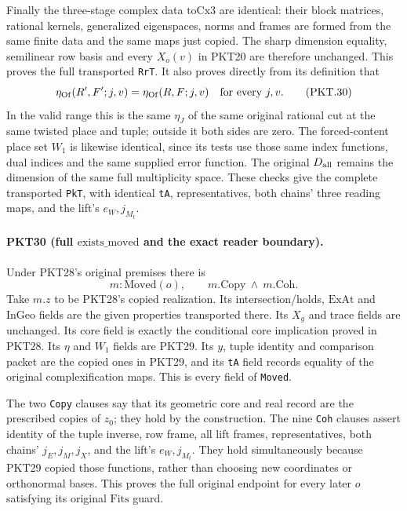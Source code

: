 Finally the three-stage complex data $\mathrm{toCx3}$ are identical:
their block matrices, rational kernels, generalized eigenspaces, norms and
frames are formed from the same finite data and the same maps just copied.
The sharp dimension equality, semilinear row basis and every $X_o(v)$
in PKT20 are therefore unchanged.  This proves the full transported
\texttt{RrT}.  It also proves directly from its definition that
\[
 \eta_{\rm Of}(R',F';j,v)=\eta_{\rm Of}(R,F;j,v)
 \quad\text{for every }j,v.\tag{PKT.30}
\]
In the valid range this is the same $\eta_J$ of the same original rational
cut at the same twisted place and tuple; outside it both sides are zero.
The forced-content place set $W_1$ is likewise identical, since its tests
use those same index functions, dual indices and the same supplied error
function.  The original $D_{\rm all}$ remains the dimension of the same
full multiplicity space.  These checks give the complete transported
\texttt{PkT}, with identical \texttt{tA}, representatives, both chains'
three reading maps, and the lift's $e_W,j_{M_t}$.

\paragraph{PKT30 (full $\mathrm{exists\_moved}$ and the exact reader boundary).}\label{claim:PKT30}
Under PKT28's original premises there is
\[
 m:\mathrm{Moved}(o),\qquad m.\mathrm{Copy}\ \wedge\ m.\mathrm{Coh}.
 \tag{PKT.31}
\]
Take $m.z$ to be PKT28's copied realization.  Its intersection/holds,
$\mathrm{ExAt}$ and $\mathrm{InGeo}$ fields are the given properties
transported there.  Its $X_g$ and trace fields are unchanged.  Its core
field is exactly the conditional core implication proved in PKT28.
Its $\eta$ and $W_1$ fields are PKT29.  Its $y$, tuple identity and
comparison packet are the copied ones in PKT29, and its \texttt{tA}
field records equality of the original complexification maps.  This is
every field of \texttt{Moved}.

The two \texttt{Copy} clauses say that its geometric core and real record
are the prescribed copies of $z_0$; they hold by the construction.  The
nine \texttt{Coh} clauses assert identity of the tuple inverse, row frame,
all lift frames, representatives, both chains' $j_E,j_M,j_X$, and the
lift's $e_W,j_{M_t}$.  They hold simultaneously because PKT29 copied
those functions, rather than choosing new coordinates or orthonormal
bases.  This proves the full original endpoint for every later $o$
satisfying its original $\mathrm{Fits}$ guard.

